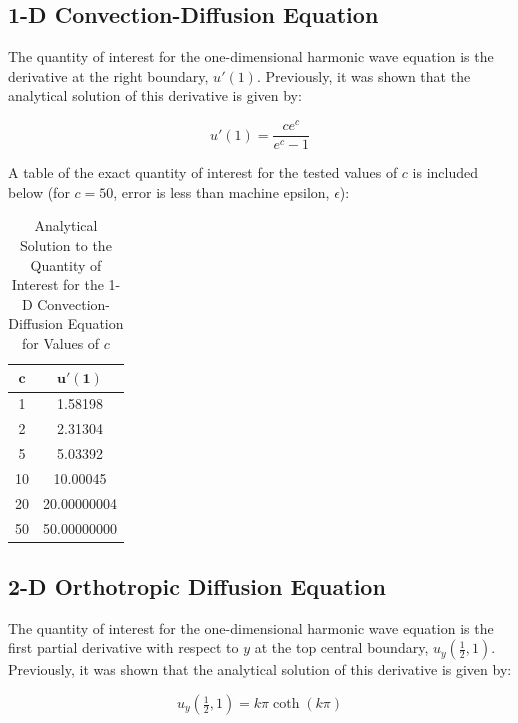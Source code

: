 \documentclass[10pt]{article}		%
\numberwithin{equation}{section}
\begin{document}
\subsection{1-D Convection-Diffusion Equation}

The quantity of interest for the one-dimensional harmonic wave equation is the derivative at the right boundary, $u'(1)$. Previously, it was shown that the analytical solution of this derivative is given by:

\begin{equation}
u'(1) = \frac{ce^{c}}{e^c-1}
\end{equation}

A table of the exact quantity of interest for the tested values of $c$ is included below (for $c=50$, error is less than machine epsilon, $\epsilon$):
\begin{table}[H]
	\caption{Analytical Solution to the Quantity of Interest for the 1-D Convection-Diffusion Equation for Values of $c$}
	\begin{tabular}{|c|c|}
		\hline 
		$\mathbf{c}$ & $\mathbf{u'(1)}$ \\ 
		\hline 
		1 & 1.58198 \\ 
		\hline 
		2 & 2.31304 \\ 
		\hline 
		5 & 5.03392 \\ 
		\hline 
		10 & 10.00045 \\ 
		\hline 
		20 & 20.00000004 \\ 
		\hline 
		50 & 50.00000000 \\ 
		\hline 
	\end{tabular}
\end{table} 

\subsection{2-D Orthotropic Diffusion Equation}

The quantity of interest for the one-dimensional harmonic wave equation is the first partial derivative with respect to $y$ at the top central boundary, $u_y(\tfrac{1}{2}, 1)$. Previously, it was shown that the analytical solution of this derivative is given by:

\begin{equation}
u_y\left(\tfrac{1}{2},1\right) = k\pi \coth(k\pi)
\end{equation}
\end{document}

